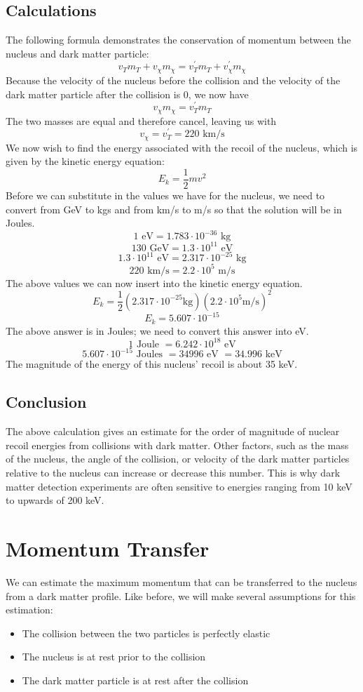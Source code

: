 \documentclass{article}
\begin{document}
\subsection{Calculations}
The following formula demonstrates the conservation of momentum between the nucleus and dark matter particle:
$$v_{T}m_{T} + v_{\chi}m_{\chi} = v^{\prime}_{T}m_{T} + v^{\prime}_{\chi}m_{\chi} $$
Because the velocity of the nucleus before the collision and the velocity of the dark matter particle after the collision is 0, we now have
$$v_{\chi}m_{\chi} = v^{\prime}_{T}m_{T}$$
The two masses are equal and therefore cancel, leaving us with
$$v_{\chi} = v^{\prime}_{T} = 220 \textrm{ km/s}$$
We now wish to find the energy associated with the recoil of the nucleus, which is given by the kinetic energy equation:
$$E_{k} = \frac{1}{2} mv^{2}$$
Before we can substitute in the values we have for the nucleus, we need to convert from GeV to kgs and from km/s to m/s so that the solution will be in Joules. 
$$1 \textrm{ eV} = 1.783\cdot 10^{-36} \textrm{ kg}$$
$$130 \textrm{ GeV} = 1.3\cdot 10^{11} \textrm{ eV} $$
$$1.3\cdot 10^{11} \textrm{ eV} = 2.317\cdot 10^{-25} \textrm{ kg}$$
$$220\textrm{ km/s} = 2.2\cdot 10^{5}\textrm{ m/s}$$
The above values we can now insert into the kinetic energy equation.
$$E_{k} = \frac{1}{2}(2.317\cdot 10^{-25}\textrm{kg})(2.2\cdot 10^{5}\textrm{m/s})^{2}$$
$$E_{k} = 5.607\cdot 10^{-15}$$
The above answer is in Joules; we need to convert this answer into eV. 
$$1 \textrm{ Joule }= 6.242\cdot 10^{18} \textrm{ eV}$$
$$5.607\cdot 10^{-15}\textrm{ Joules } = 34996 \textrm{ eV }= 34.996\textrm{ keV}$$
The magnitude of the energy of this nucleus' recoil is about 35 keV. 

\subsection{Conclusion}
The above calculation gives an estimate for the order of magnitude of nuclear recoil energies from collisions with dark matter. Other factors, such as the mass of the nucleus, the angle of the collision, or velocity of the dark matter particles relative to the nucleus can increase or decrease this number. This is why dark matter detection experiments are often sensitive to energies ranging from 10 keV to upwards of 200 keV. 

\section{Momentum Transfer}
We can estimate the maximum momentum that can be transferred to the nucleus from a dark matter profile. Like before, we will make several assumptions for this estimation:
\begin{itemize}
\item The collision between the two particles is perfectly elastic
\item The nucleus is at rest prior to the collision
\item The dark matter particle is at rest after the collision
\end{itemize}
\end{document}
